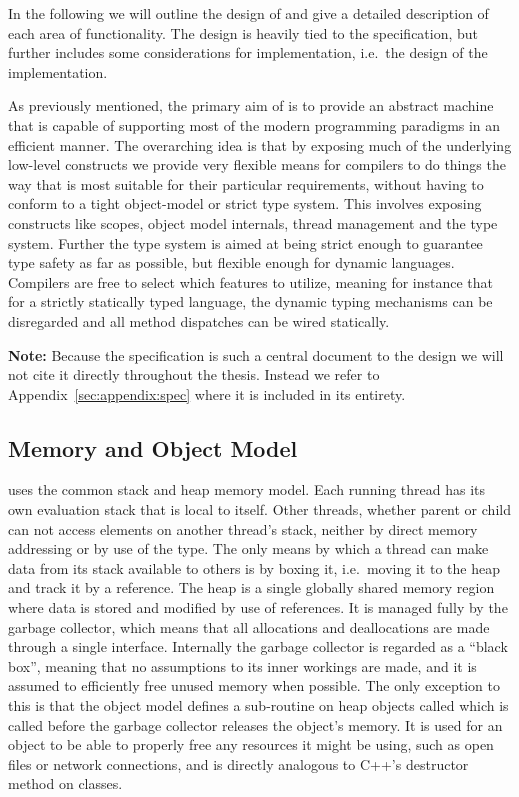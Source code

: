 In the following we will outline the design of \thename{} and give a detailed
description of each area of functionality. The design is heavily tied to the
\thename{} specification, but further includes some considerations for
implementation, i.e.~the design of the implementation.

As previously mentioned, the primary aim of \thename{} is to provide an abstract
machine that is capable of supporting most of the modern programming paradigms
in an efficient manner. The overarching idea is that by exposing much of the
underlying low-level constructs we provide very flexible means for compilers to
do things the way that is most suitable for their particular requirements,
without having to conform to a tight object-model or strict type system. This
involves exposing constructs like scopes, object model internals, thread
management and the type system. Further the type system is aimed at being strict
enough to guarantee type safety as far as possible, but flexible enough for
dynamic languages. Compilers are free to select which features to utilize,
meaning for instance that for a strictly statically typed language, the dynamic
typing mechanisms can be disregarded and all method dispatches can be wired
statically.

\textbf{Note:} Because the specification is such a central document to the
design we will not cite it directly throughout the thesis. Instead we refer to
Appendix~\ref{sec:appendix:spec} where it is included in its entirety.

\subsection{Memory and Object Model}
\label{sec:design:object-model}

\thename{} uses the common stack and heap memory model. Each running thread has
its own evaluation stack that is local to itself. Other threads, whether parent
or child can not access elements on another thread's stack, neither by direct
memory addressing or by use of the  type. The only means by
which a thread can make data from its stack available to others is by boxing it,
i.e.~moving it to the heap and track it by a reference. The heap is a single
globally shared memory region where data is stored and modified by use of
references. It is managed fully by the garbage collector, which means that all
allocations and deallocations are made through a single interface. Internally
the garbage collector is regarded as a ``black box'', meaning that no
assumptions to its inner workings are made, and it is assumed to efficiently
free unused memory when possible. The only exception to this is that the object
model defines a sub-routine on heap objects called  which is
called before the garbage collector releases the object's memory. It is used for
an object to be able to properly free any resources it might be using, such as
open files or network connections, and is directly analogous to C++'s destructor
method on classes.

